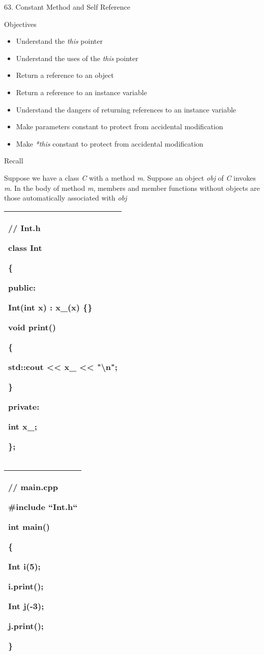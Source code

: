 \documentclass[
]{article}
\author{}
\date{}
\providecommand{\tightlist}{%
  \setlength{\itemsep}{0pt}\setlength{\parskip}{0pt}}
\begin{document}
63. Constant Method and Self Reference

Objectives

\begin{itemize}
\tightlist
\item
  Understand the \emph{this} pointer
\item
  Understand the uses of the \emph{this} pointer
\item
  Return a reference to an object
\item
  Return a reference to an instance variable
\item
  Understand the dangers of returning references to an instance variable
\item
  Make parameters constant to protect from accidental modification
\item
  Make \emph{*this} constant to protect from accidental modification
\end{itemize}

Recall

Suppose we have a class \emph{C} with a method \emph{m}. Suppose an
object \emph{obj} of \emph{C} invokes \emph{m}. In the body of method
\emph{m}, members and member functions without objects are those
automatically associated with \emph{obj}

\begin{longtable}[]{@{}l@{}}
\toprule
\endhead
\begin{minipage}[t]{0.97\columnwidth}\raggedright
// Int.h

class Int

\{

public:

Int(int x) : x\_(x) \{\}

void print()

\{

std::cout \textless\textless{} x\_ \textless\textless{}
"\textbackslash n";

\}

private:

int x\_;

\};\strut
\end{minipage}\tabularnewline
\bottomrule
\end{longtable}

\begin{longtable}[]{@{}l@{}}
\toprule
\endhead
\begin{minipage}[t]{0.97\columnwidth}\raggedright
// main.cpp

\#include ``Int.h``

int main()

\{

Int i(5);

i.print();

Int j(-3);

j.print();

\}\strut
\end{minipage}\tabularnewline
\bottomrule
\end{longtable}
\end{document}
